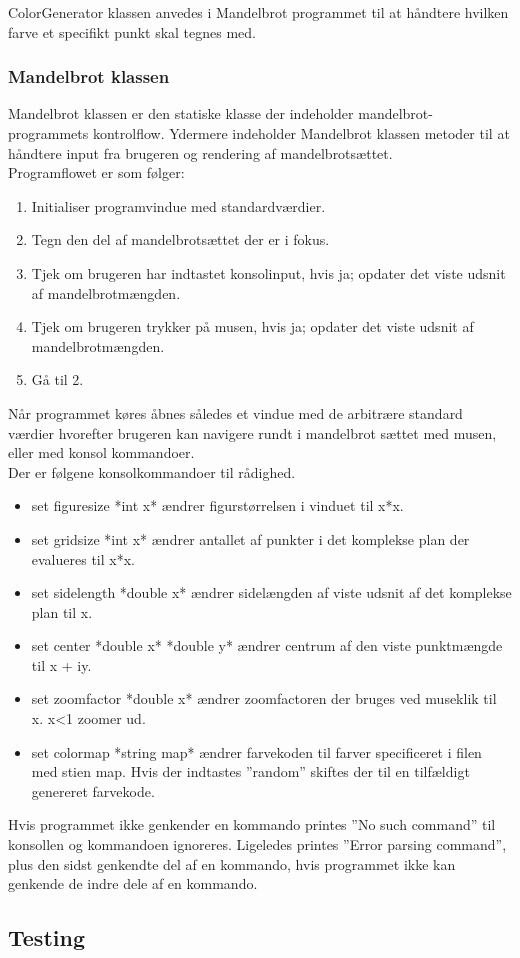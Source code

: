 ColorGenerator klassen anvedes i Mandelbrot programmet til at håndtere hvilken farve et specifikt punkt skal tegnes med.

\subsubsection{Mandelbrot klassen}
Mandelbrot klassen er den statiske klasse der indeholder mandelbrot-programmets kontrolflow. Ydermere indeholder Mandelbrot klassen metoder til at håndtere input fra brugeren og rendering af mandelbrotsættet. \\

Programflowet er som følger:
\begin{enumerate}
    \item Initialiser programvindue med standardværdier.
    \item Tegn den del af mandelbrotsættet der er i fokus.
    \item Tjek om brugeren har indtastet konsolinput, hvis ja; opdater det viste udsnit af mandelbrotmængden.
    \item Tjek om brugeren trykker på musen, hvis ja; opdater det viste udsnit af mandelbrotmængden.
    \item Gå til 2.
\end{enumerate}

Når programmet køres åbnes således et vindue med de arbitrære standard værdier hvorefter brugeren kan navigere rundt i mandelbrot sættet med musen, eller med konsol kommandoer. \\
Der er følgene konsolkommandoer til rådighed.
\begin{itemize}
    \item set figuresize *int x* ændrer figurstørrelsen i vinduet til x*x.
    \item set gridsize *int x* ændrer antallet af punkter i det komplekse plan der evalueres til x*x.
    \item set sidelength *double x* ændrer sidelængden af viste udsnit af det komplekse plan til x.
    \item set center *double x* *double y* ændrer centrum af den viste punktmængde til x + iy.
    \item set zoomfactor *double x* ændrer zoomfactoren der bruges ved museklik til x. x<1 zoomer ud.
    \item set colormap *string map* ændrer farvekoden til farver specificeret i filen med stien map. Hvis der indtastes ''random'' skiftes der til en tilfældigt genereret farvekode.
\end{itemize}
Hvis programmet ikke genkender en kommando printes ''No such command'' til konsollen og kommandoen ignoreres. Ligeledes printes ''Error parsing command'', plus den sidst genkendte del af en kommando,  hvis programmet ikke kan genkende de indre dele af en kommando.


\subsection{Testing}

